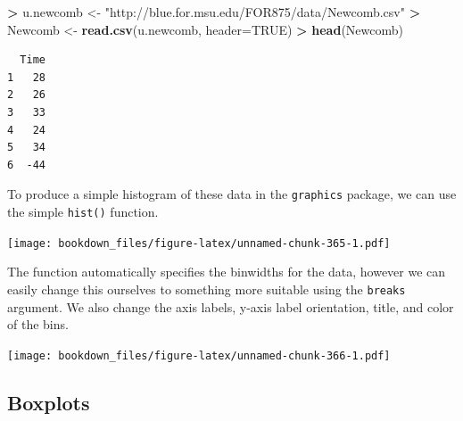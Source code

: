 \documentclass[]{krantz}
\makeatletter
\newenvironment{Shaded}{\begin{snugshade}}{\end{snugshade}}
\newcommand{\KeywordTok}[1]{\textcolor[rgb]{0.27,0.27,0.27}{\textbf{#1}}}
\newcommand{\DataTypeTok}[1]{\textcolor[rgb]{0.27,0.27,0.27}{#1}}
\newcommand{\DecValTok}[1]{\textcolor[rgb]{0.06,0.06,0.06}{#1}}
\newcommand{\StringTok}[1]{\textcolor[rgb]{0.5,0.5,0.5}{#1}}
\newcommand{\OtherTok}[1]{\textcolor[rgb]{0.37,0.37,0.37}{#1}}
\newcommand{\OperatorTok}[1]{\textcolor[rgb]{0.43,0.43,0.43}{\textbf{#1}}}
\newcommand{\NormalTok}[1]{#1}
\newenvironment{kframe}{%
\medskip{}
\setlength{\fboxsep}{.8em}
 \def\at@end@of@kframe{}%
 \ifinner\ifhmode%
  \def\at@end@of@kframe{\end{minipage}}%
  \begin{minipage}{\columnwidth}%
 \fi\fi%
 \def\FrameCommand##1{\hskip\@totalleftmargin \hskip-\fboxsep
 \colorbox{shadecolor}{##1}\hskip-\fboxsep
     \hskip-\linewidth \hskip-\@totalleftmargin \hskip\columnwidth}%
 \MakeFramed {\advance\hsize-\width
   \@totalleftmargin\z@ \linewidth\hsize
   \@setminipage}}%
 {\par\unskip\endMakeFramed%
 \at@end@of@kframe}
\renewenvironment{Shaded}{\begin{kframe}}{\end{kframe}}
\makeatother
\begin{document}
\begin{Shaded}
\begin{Highlighting}[]
\OperatorTok{>}\StringTok{ }\NormalTok{u.newcomb <-}\StringTok{ "http://blue.for.msu.edu/FOR875/data/Newcomb.csv"}
\OperatorTok{>}\StringTok{ }\NormalTok{Newcomb <-}\StringTok{ }\KeywordTok{read.csv}\NormalTok{(u.newcomb, }\DataTypeTok{header=}\OtherTok{TRUE}\NormalTok{)}
\OperatorTok{>}\StringTok{ }\KeywordTok{head}\NormalTok{(Newcomb)}
\end{Highlighting}
\end{Shaded}

\begin{verbatim}
  Time
1   28
2   26
3   33
4   24
5   34
6  -44
\end{verbatim}

To produce a simple histogram of these data in the \texttt{graphics}
package, we can use the simple \texttt{hist()} function.

\begin{Shaded}
\end{Shaded}

\texttt{[image: bookdown\_files/figure-latex/unnamed-chunk-365-1.pdf]}

The function automatically specifies the binwidths for the data, however
we can easily change this ourselves to something more suitable using the
\texttt{breaks} argument. We also change the axis labels, y-axis label
orientation, title, and color of the bins.

\begin{Shaded}
\end{Shaded}

\texttt{[image: bookdown\_files/figure-latex/unnamed-chunk-366-1.pdf]}

\subsection{Boxplots}\label{boxplots-1}
\end{document}
